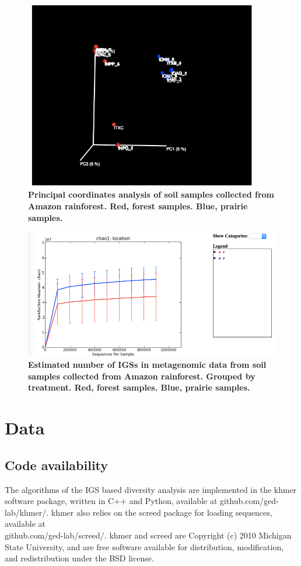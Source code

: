 \begin{figure}[!ht]
 \centerline{\includegraphics[width=4in]{./figures/IGS_ARMO_beta.png}}
\caption{\bf Principal coordinates analysis of soil samples collected from
Amazon rainforest. Red, forest samples. Blue, prairie
samples.}
\label{fig:ARMO_beta}
\end{figure}

\begin{figure}[!ht]
 \centerline{\includegraphics[width=7in]{./figures/IGS_ARMO_alpha.png}}
\caption{\bf Estimated number of IGSs in metagenomic data from soil samples
collected from Amazon rainforest. Grouped by treatment. Red, forest samples. Blue, prairie
samples.}

\label{fig:ARMO_alpha}
\end{figure}


\section{Data}


\subsection{Code availability}
The algorithms of the IGS based diversity analysis are implemented 
 in the khmer software
package, written in C++ and Python, available at github.com/ged-lab/khmer/.
 khmer also relies on the screed package for loading
sequences, available at \\
github.com/ged-lab/screed/.
khmer and screed are Copyright (c) 2010 Michigan State University, and are free
software available for distribution, modification, and redistribution under the
BSD license.

